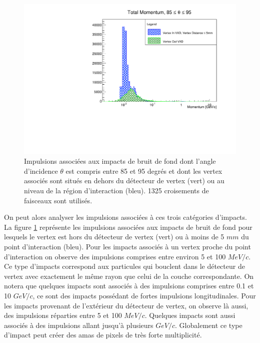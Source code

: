   \begin{figure}[!htb]
    \begin{center}
      \includegraphics[scale=0.50]{./figures/Track_Tilts_Beamstrahlung/beamstrahlung_Theta/totalMomentum_theta_85_95_2Zones.pdf}
      \caption{Impulsions associ\'ees aux impacts de bruit de fond dont l'angle d'incidence $\theta$ est compris entre 85 et 95 degr\'es et dont les vertex associ\'es sont situ\'es en dehors du d\'etecteur de vertex (vert) ou au niveau de la r\'egion d'interaction (bleu). 1325 croisements de faisceaux sont utilis\'es.}
      \label{fig:P_Theta_theta85_95_in_out_VXD}
    \end{center}
  \end{figure}
  
  \medskip

  On peut alors analyser les impulsions associ\'ees \`a ces trois cat\'egories d'impacts. La figure \ref{fig:P_Theta_theta85_95_in_out_VXD} repr\'esente les impulsions associ\'ees aux impacts de bruit de fond pour lesquels le vertex est hors du d\'etecteur de vertex (vert) ou \`a moins de 5 $mm$ du point d'interaction (bleu). Pour les impacts associ\'es \`a un vertex proche du point d'interaction on observe des impulsions comprises entre environ 5 et 100 $MeV/c$. Ce type d'impacts correspond aux particules qui bouclent dans le détecteur de vertex avec exactement le m\^eme rayon que celui de la couche correspondante. On notera que quelques impacts sont associ\'es \`a des impulsions comprises entre 0.1 et 10 $GeV/c$, ce sont des impacts poss\'edant de fortes impulsions longitudinales. Pour les impacts provenant de l'extérieur du d\'etecteur de vertex, on observe là aussi, des impulsions réparties entre 5 et 100 $MeV/c$. Quelques impacts sont aussi associ\'es \`a des impulsions allant jusqu'\`a plusieurs $GeV/c$. Globalement ce type d'impact peut cr\'eer des amas de pixels de tr\`es forte multiplicit\'e.
  
